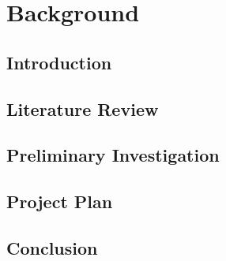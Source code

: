 \chapter{Background}

	\section{Introduction}

	\section{Literature Review}

	\section{Preliminary Investigation}

	\section{Project Plan}

	\section{Conclusion}